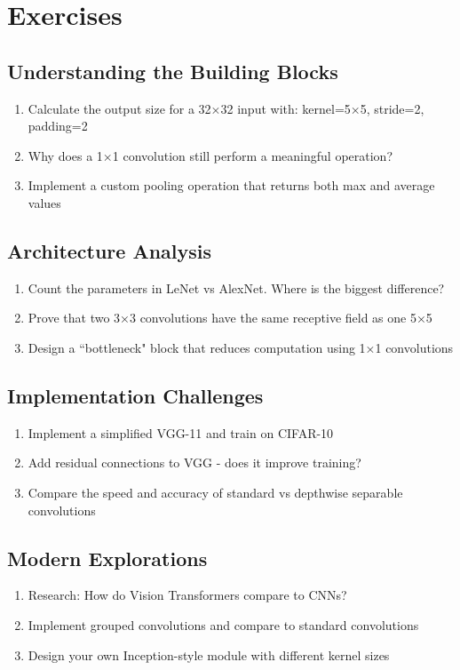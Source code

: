 \documentclass{article}
\begin{document}
\section{Exercises}

\subsection{Understanding the Building Blocks}
\begin{enumerate}
    \item Calculate the output size for a 32×32 input with: kernel=5×5, stride=2, padding=2
    \item Why does a 1×1 convolution still perform a meaningful operation?
    \item Implement a custom pooling operation that returns both max and average values
\end{enumerate}

\subsection{Architecture Analysis}
\begin{enumerate}
    \item Count the parameters in LeNet vs AlexNet. Where is the biggest difference?
    \item Prove that two 3×3 convolutions have the same receptive field as one 5×5
    \item Design a ``bottleneck" block that reduces computation using 1×1 convolutions
\end{enumerate}

\subsection{Implementation Challenges}
\begin{enumerate}
    \item Implement a simplified VGG-11 and train on CIFAR-10
    \item Add residual connections to VGG - does it improve training?
    \item Compare the speed and accuracy of standard vs depthwise separable convolutions
\end{enumerate}

\subsection{Modern Explorations}
\begin{enumerate}
    \item Research: How do Vision Transformers compare to CNNs?
    \item Implement grouped convolutions and compare to standard convolutions
    \item Design your own Inception-style module with different kernel sizes
\end{enumerate}
\end{document}
